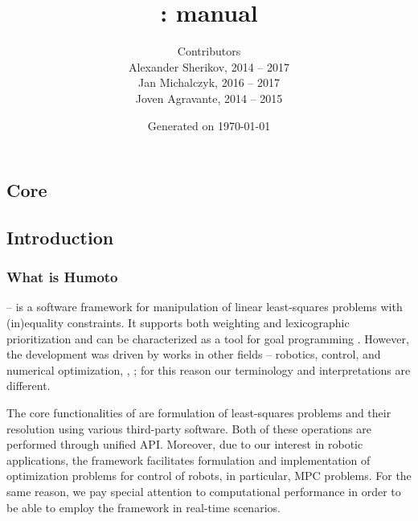\documentclass[12pt,a4paper]{book}
\title{\bf \projectname: manual}
\author{
    {\small Contributors}\\
    Alexander Sherikov, 2014 -- 2017\\
    Jan Michalczyk, 2016 -- 2017\\
    Joven Agravante, 2014 -- 2015
}
\date{\small Generated on \today}
\begin{document}
\begin{refsection}
\maketitle
\tableofcontents

\clearpage
{}
\printacronyms
{}


\part{Core}

\chapter{Introduction}


\section{What is Humoto}\label{sec.intro}

\projectname{} -- is a software framework for manipulation of linear
    least-squares problems with (in)equality constraints. It supports both
    weighting and lexicographic prioritization and can be characterized as a
    tool for goal programming \cite{wiki2017gp}. However, the development was
    driven by works in other fields -- robotics, control, and numerical
    optimization, \EG, \cite{Dimitrov2015preprint, Saab2012tranrob,
    Escande2014ijrr}; for this reason our terminology and interpretations are
    different.


The core functionalities of \projectname are formulation of least-squares
    problems and their resolution using various third-party software. Both of
    these operations are performed through unified \ac{API}. Moreover, due to
    our interest in robotic applications, the framework facilitates formulation
    and implementation of optimization problems for control of robots, in
    particular, \ac{MPC} problems. For the same reason, we pay special
    attention to computational performance in order to be able to employ the
    framework in real-time scenarios.



\end{refsection}
\end{document}
